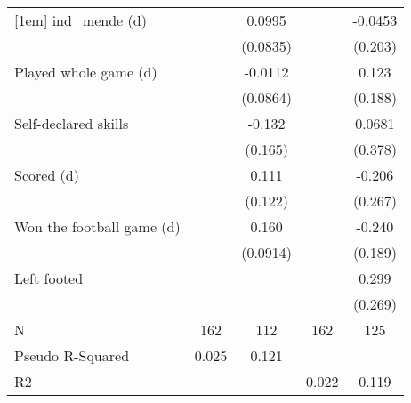 {\begin{tabular}{l*{4}{c}}
[1em]
ind\_mende (d)       &                     &      0.0995         &                     &     -0.0453         \\
                    &                     &    (0.0835)         &                     &     (0.203)         \\
[1em]
Played whole game (d)&                     &     -0.0112         &                     &       0.123         \\
                    &                     &    (0.0864)         &                     &     (0.188)         \\
[1em]
Self-declared skills&                     &      -0.132         &                     &      0.0681         \\
                    &                     &     (0.165)         &                     &     (0.378)         \\
[1em]
Scored (d)          &                     &       0.111         &                     &      -0.206         \\
                    &                     &     (0.122)         &                     &     (0.267)         \\
[1em]
Won the football game (d)&                     &       0.160\sym{*}  &                     &      -0.240         \\
                    &                     &    (0.0914)         &                     &     (0.189)         \\
[1em]
Left footed         &                     &                     &                     &       0.299         \\
                    &                     &                     &                     &     (0.269)         \\
\hline
N                   &         162         &         112         &         162         &         125         \\
Pseudo R-Squared    &       0.025         &       0.121         &                     &                     \\
R2                  &                     &                     &       0.022         &       0.119         \\
\hline\hline
\end{tabular}
}
